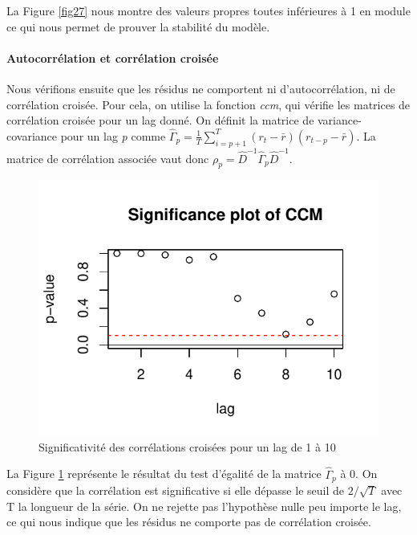 \documentclass[11pt,]{article}
\let\oldparagraph\paragraph
\renewcommand{\paragraph}[1]{\oldparagraph{#1}\mbox{}}
\begin{document}
La Figure \ref{fig27} nous montre des valeurs propres toutes inférieures
à 1 en module ce qui nous permet de prouver la stabilité du modèle.

\paragraph{Autocorrélation et corrélation
croisée}\label{autocorrelation-et-correlation-croisee}

Nous vérifions ensuite que les résidus ne comportent ni
d'autocorrélation, ni de corrélation croisée. Pour cela, on utilise la
fonction \emph{ccm}, qui vérifie les matrices de corrélation croisée
pour un lag donné. On définit la matrice de variance-covariance pour un
lag \emph{p} comme
\(\hat{\Gamma}_p = \frac{1}{T}\sum_{i=p+1}^{T} (r_t - \bar{r})(r_{t-p} - \bar{r})\).
La matrice de corrélation associée vaut donc
\(\rho_p = \hat{D}^{-1}\hat{\Gamma}_p\hat{D}^{-1}\).

\begin{figure}[htbp]
\centering
\includegraphics{doc_files/figure-latex/unnamed-chunk-47-1.pdf}
\caption{\label{fig28} Significativité des corrélations croisées pour un
lag de 1 à 10}
\end{figure}

La Figure \ref{fig28} représente le résultat du test d'égalité de la
matrice \(\hat{\Gamma}_p\) à 0. On considère que la corrélation est
significative si elle dépasse le seuil de \(2/\sqrt{T}\) avec T la
longueur de la série. On ne rejette pas l'hypothèse nulle peu importe le
lag, ce qui nous indique que les résidus ne comporte pas de corrélation
croisée.
\end{document}
